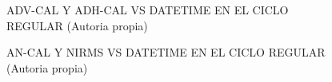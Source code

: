 \begin{figure}[H]
  \hfill
  \hfill
  \hfill
  \caption{ADV-CAL Y ADH-CAL VS DATETIME EN EL CICLO REGULAR (Autoria propia)}
  \end{figure}
\begin{figure}[H]
  \hfill
  \hfill
  \hfill
  \caption{AN-CAL Y NIRMS VS DATETIME EN EL CICLO REGULAR (Autoria propia)}
  \end{figure}
